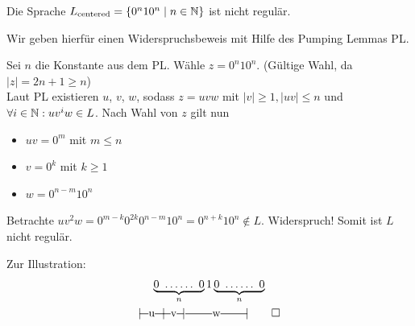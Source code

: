 \begin{Bsp}\label{bsp:2.centeredPL}%
        Die Sprache $L_\text{centered}=\{0^n10^n \mid n\in\mathbb{N}\}$ ist nicht regulär.
        
        Wir geben hierfür einen Widerspruchsbeweis mit Hilfe des Pumping Lemmas \ac{PL}.
        
        Sei $n$ die Konstante aus dem \ac{PL}. Wähle $z=0^n10^n$. 
        (Gültige Wahl, da $|z|=2n+1\geq n$)\\
        Laut PL existieren $u$, $v$, $w$, sodass $z=uvw$ mit $|v|\geq 1, |uv|\leq n$ und $\forall i \in \mathbb{N}: uv^iw \in L$. 
        Nach Wahl von $z$ gilt nun
  \begin{itemize}
  \item $uv = 0^m$ mit $m\leq n$
  \item $v = 0^k$ mit $k\geq 1$
  \item $w = 0^{n-m}10^n$ 
  \end{itemize}
  Betrachte $uv^2w = 0^{m-k}0^{2k}0^{n-m}10^n = 0^{n+k}10^n \notin L$. Widerspruch!
  Somit ist $L$ nicht regulär.
  
  Zur Illustration:
  \begin{gather*}
    \underbrace{0\ \dots\dots\ 0}_{n} 1 \underbrace{0\ \dots\dots\ 0}_{n}\\
    |\!\ruleplaceholder[u]{\widthof{0\ \dots }} \!|\! \ruleplaceholder[v]{\widthof{\dots 0}}\!|%
    \ruleplaceholder[w]{\widthof{\ \ \ $1\ \dots\dots\ 1$}}\!|
    \qedhere
  \end{gather*}
\end{Bsp}

